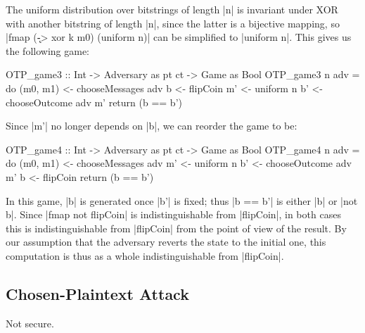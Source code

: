 The uniform distribution over bitstrings of length |n| is invariant under XOR with another bitstring of length |n|,
since the latter is a bijective mapping, so |fmap (\k -> xor k m0) (uniform n)| can be simplified to |uniform n|.  This
gives us the following game:
\begin{code}
OTP_game3 :: Int -> Adversary as pt ct -> Game as Bool
OTP_game3 n adv = do
    (m0, m1) <- chooseMessages adv
    b <- flipCoin
    m' <- uniform n
    b' <- chooseOutcome adv m'
    return (b == b')
\end{code}

Since |m'| no longer depends on |b|, we can reorder the game to be:
\begin{code}
OTP_game4 :: Int -> Adversary as pt ct -> Game as Bool
OTP_game4 n adv = do
    (m0, m1) <- chooseMessages adv
    m' <- uniform n
    b' <- chooseOutcome adv m'
    b <- flipCoin
    return (b == b')
\end{code}

In this game, |b| is generated once |b'| is fixed; thus |b == b'| is either |b| or |not b|.  Since |fmap not flipCoin|
is indistinguishable from |flipCoin|, in both cases this is indistinguishable from |flipCoin| from the point of view of
the result.  By our assumption that the adversary reverts the state to the initial one, this computation is thus as a
whole indistinguishable from |flipCoin|.


\subsection{Chosen-Plaintext Attack}

Not secure.


